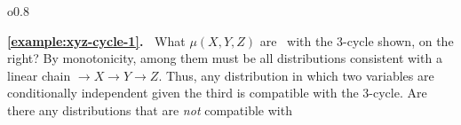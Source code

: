\begin{subappendices}
\settowidth{\cycleboxlen}{\usebox{\cyclebox}}
\begin{wrapfigure}[5]{o}{0.8\cycleboxlen}
    \vspace{-0.8em}
\end{wrapfigure}
\textbf{\cref{example:xyz-cycle-1}.~} 
    What
    $\mu(X,Y,Z)$
    are \cible\ 
    with 
    the 3-cycle shown, on the right?
    By monotonicity,
    among them must be all distributions consistent with a linear chain ${\to}X{\to}Y{\to}Z$. Thus,  
        any distribution
    in which two variables are conditionally independent given the third
    is compatible with 
    the 3-cycle.
    Are there any distributions that are \emph{not} compatible with 

\end{subappendices}
